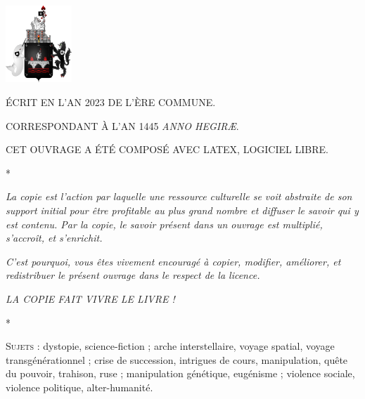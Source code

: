\documentclass[a4paper,12pt,twoside,french]{book}
\begin{document}
    \begin{center}
    \null\vfill

      \footnotesize



      \vspace{-10em}
      \includegraphics[width=2.5cm]{ecu-fauve.pdf}


      \vspace{4em}


      \MakeUppercase{Écrit en l’an 2023 de l’Ère commune.}

      \MakeUppercase{Correspondant à l’an 1445 \emph{Anno Hegiræ}.}

      \MakeUppercase{Cet ouvrage a été composé avec \LaTeX, logiciel libre.}

      \vspace{1em}
      *

      \emph{La copie est l’action par laquelle une ressource culturelle se voit abstraite de son support initial pour être profitable au plus grand nombre et diffuser le savoir qui y est contenu. Par la copie, le savoir présent dans un ouvrage est multiplié, s’accroît, et s’enrichit.}

      \emph{C’est pourquoi, vous êtes vivement encouragé à copier, modifier, améliorer, et redistribuer le présent ouvrage dans le respect de la licence.}

      \emph{{\uppercase{La copie fait vivre le livre !}}}


      \vspace{1em}
      *

      \textsc{Sujets :} dystopie, science-fiction ; arche interstellaire, voyage spatial, voyage transgénérationnel  ; crise de succession, intrigues de cours, manipulation, quête du pouvoir, trahison, ruse ; manipulation génétique, eugénisme ; violence sociale, violence politique, alter-humanité.

      \vspace{1em}


\end{center}
\end{document}
